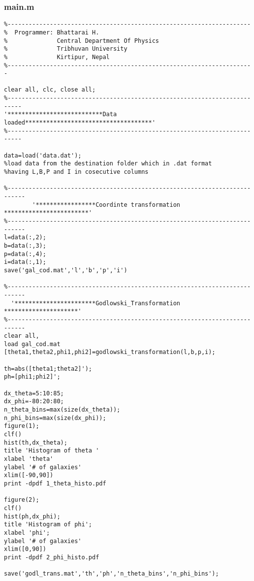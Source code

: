 \subsubsection*{main.m}
\begin{verbatim}
%--------------------------------------------------------------------- 
%  Programmer: Bhattarai H.                                                                         
%	           Central Department Of Physics                   
%              Tribhuvan University                             
%              Kirtipur, Nepal                                  
%----------------------------------------------------------------------

clear all, clc, close all;
%--------------------------------------------------------------------------
'***************************Data loaded************************************'
%--------------------------------------------------------------------------

data=load('data.dat');   
%load data from the destination folder which in .dat format 
%having L,B,P and I in cosecutive columns                
                       
%---------------------------------------------------------------------------   
		'*****************Coordinte transformation ************************'
%---------------------------------------------------------------------------
l=data(:,2);
b=data(:,3);
p=data(:,4);
i=data(:,1);
save('gal_cod.mat','l','b','p','i')    

%---------------------------------------------------------------------------
  '***********************Godlowski_Transformation *********************'
%---------------------------------------------------------------------------
clear all, 
load gal_cod.mat
[theta1,theta2,phi1,phi2]=godlowski_transformation(l,b,p,i); 
 
th=abs([theta1;theta2]');
ph=[phi1;phi2]';

dx_theta=5:10:85;
dx_phi=-80:20:80;
n_theta_bins=max(size(dx_theta));
n_phi_bins=max(size(dx_phi));
figure(1);
clf()
hist(th,dx_theta);
title 'Histogram of theta '
xlabel 'theta'
ylabel '# of galaxies'
xlim([-90,90])
print -dpdf 1_theta_histo.pdf

figure(2);
clf()
hist(ph,dx_phi);
title 'Histogram of phi';
xlabel 'phi';
ylabel '# of galaxies'
xlim([0,90])
print -dpdf 2_phi_histo.pdf

save('godl_trans.mat','th','ph','n_theta_bins','n_phi_bins');


\end{verbatim}
